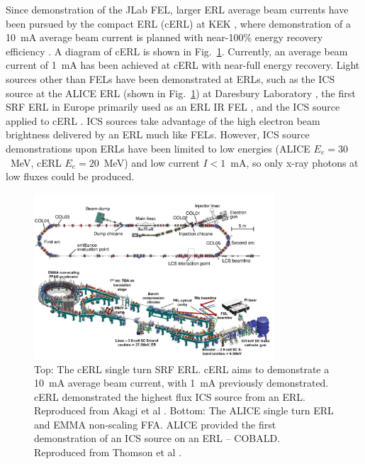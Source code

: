 \documentclass[../main.tex]{subfiles}
\begin{document}
Since demonstration of the JLab FEL, larger ERL average beam currents have been pursued by the compact ERL (cERL) at KEK \cite{akagi2016narrow}, where demonstration of a 10~\si{\milli\ampere} average beam current is planned with near-100\% energy recovery efficiency \cite{adolphsen2022european}. A diagram of cERL is shown in Fig.~\ref{fig:cERL_ALICE_diagram}. Currently, an average beam current of 1~\si{\milli\ampere} has been achieved at cERL \cite{obina20191} with near-full energy recovery. Light sources other than FELs have been demonstrated at ERLs, such as the ICS source at the ALICE ERL (shown in Fig.~\ref{fig:cERL_ALICE_diagram}) at Daresbury Laboratory \cite{priebe2008inverse,priebe2010first}, the first SRF ERL in Europe primarily used as an ERL IR FEL \cite{thompson2014status}, and the ICS source applied to cERL \cite{akagi2016narrow}. ICS sources take advantage of the high electron beam brightness delivered by an ERL much like FELs. However, ICS source demonstrations upon ERLs have been limited to low energies (ALICE $E_{e}=30$~\si{\mega\electronvolt}, cERL  $E_{e}=20$~\si{\mega\electronvolt}) and low current $I < 1$~\si{\milli\ampere}, so only x-ray photons at low fluxes could be produced.
\begin{figure}[!h]
\centering
\includegraphics[width=0.8\textwidth]{Figures/Introduction/cERL_ALICE.pdf}
\caption{Top: The cERL single turn SRF ERL. cERL aims to demonstrate a 10~\si{\milli\ampere} average beam current, with 1~\si{\milli\ampere} previously demonstrated. cERL demonstrated the highest flux ICS source from an ERL. Reproduced from Akagi et al \cite{akagi2016narrow}. Bottom: The ALICE single turn ERL and EMMA non-scaling FFA. ALICE provided the first demonstration of an ICS source on an ERL -- COBALD. Reproduced from Thomson et al \cite{thompson2014status}.}
\label{fig:cERL_ALICE_diagram}
\end{figure}
\end{document}
